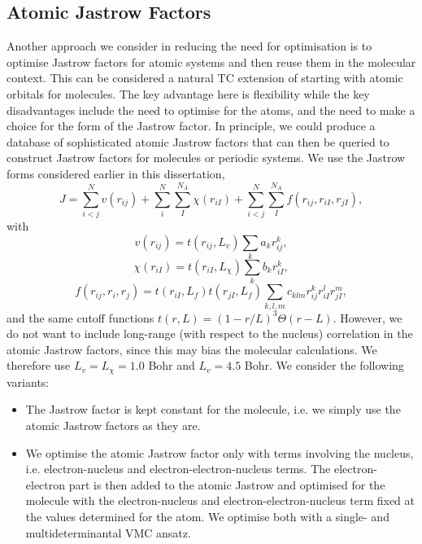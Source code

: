 \subsection{Atomic Jastrow Factors}

Another approach we consider in reducing the need for optimisation is to optimise Jastrow factors for atomic systems and then reuse them in the molecular context. This can be considered a natural TC extension of starting with atomic orbitals for molecules. The key advantage here is flexibility while the key disadvantages include the need to optimise for the atoms, and the need to make a choice for the form of the Jastrow factor. In principle, we could produce a database of sophisticated atomic Jastrow factors that can then be queried to construct Jastrow factors for molecules or periodic systems. We use the Jastrow forms considered earlier in this dissertation, \begin{equation}
    \label{eq:jastrow-3}
    J = \sum_{i<j}^Nv(r_{ij}) + \sum_i^N\sum_I^{N_A}\chi(r_{iI}) + \sum_{i<j}^N\sum_I^{N_A}f(r_{ij}, r_{iI}, r_{jI}),
\end{equation}
with
\begin{equation}
    \label{eq:dtn-jastrow-ee-3}
    v(r_{ij})    = t(r_{ij},L_v)
                    \sum_{k} a_k r_{ij}^k ,
\end{equation}
\begin{equation}
    \label{eq:dtn-jastrow-en-3}
    \chi(r_{iI}) = t(r_{iI},L_\chi)
    \sum_{k} b_k r_{iI}^k ,
\end{equation}
\begin{equation}
    \label{eq:dtn-jastrow-een-3}
    f(r_{ij}, r_{i}, r_{j}) = t(r_{iI},L_f) t(r_{jI},L_f)
    \sum_{k,l,m} c_{klm}
    r_{ij}^k r_{iI}^l r_{jI}^m ,
\end{equation}
and the same cutoff functions $t(r,L) = (1-r/L)^3
\Theta(r-L)$. However, we do not want to include long-range (with respect to the nucleus) correlation in the atomic Jastrow factors, since this may bias the molecular calculations. We therefore use $L_v=L_\chi=1.0$ Bohr and $L_{v}=4.5$ Bohr. We consider the following variants:
\begin{itemize}
    \item The Jastrow factor is kept constant for the molecule, i.e. we simply use the atomic Jastrow factors as they are.
    \item We optimise the atomic Jastrow factor only with terms involving the nucleus, i.e. electron-nucleus and electron-electron-nucleus terms. The electron-electron part is then added to the atomic Jastrow and optimised for the molecule with the electron-nucleus and electron-electron-nucleus term fixed at the values determined for the atom. We optimise both with a single- and multideterminantal VMC ansatz.
\end{itemize}

